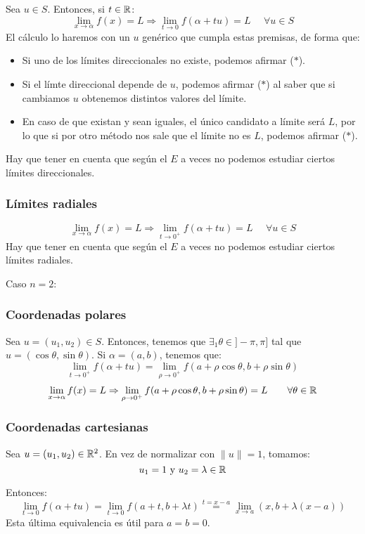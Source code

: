 Sea $u \in S$. Entonces, si $t \in \mathbb R$:
$$\lim_{x \to \alpha}f(x) = L \Rightarrow \lim_{t \to 0}f(\alpha + tu) = L~~~~~~\forall u \in S$$
El cálculo lo haremos con un $u$ genérico que cumpla estas premisas, de forma que:
\begin{itemize}
    \item Si uno de los límites direccionales no existe, podemos afirmar ($\ast$).
    \item Si el límte direccional depende de $u$, podemos afirmar ($\ast$) al saber que si cambiamos
          $u$ obtenemos distintos valores del límite.
    \item En caso de que existan y sean iguales, el único candidato a límite será $L$, por lo que si por
          otro método nos sale que el límite no es $L$, podemos afirmar ($\ast$).
\end{itemize}

Hay que tener en cuenta que según el $E$ a veces no podemos estudiar ciertos límites direccionales.

\subsubsection{Límites radiales}
$$\lim_{x \to \alpha}f(x) = L \Rightarrow \lim_{t \to 0^{+}}f(\alpha + tu) = L~~~~~~\forall u \in S$$
Hay que tener en cuenta que según el $E$ a veces no podemos estudiar ciertos límites radiales.


Caso $n=2$:
\subsubsection{Coordenadas polares}

Sea $u = (u_1,u_2)\in S$. Entonces, tenemos que $\exists_1 \theta\in ]-\pi,\pi]$ tal que $u =(\cos\theta,\sin\theta)$. Si $\alpha=(a,b)$, tenemos que:
$$\lim_{t \to 0^{+}}f(\alpha+tu) = \lim_{\rho \to 0^+}f(a+\rho \cos\theta, b+\rho \sin\theta)$$
$$\lim_{x \to \alpha}f(x)=L \Rightarrow \lim_{\rho \rightarrow 0^+}f(a+\rho \cos\theta, b+\rho \sin\theta)=L~~~
    ~~~ \forall \theta \in \mathbb R$$

\subsubsection{Coordenadas cartesianas}
Sea $u=(u_1, u_2) \in \mathbb R^2$. En vez de normalizar con $\|u\|=1$, tomamos:
$$u_1 = 1 \mbox{ y } u_2 = \lambda \in \mathbb R$$

Entonces:
$$\lim_{t \to 0}f(\alpha + tu) = \lim_{t \to 0}f(a+t,b+\lambda t)
\stackrel{t=x-a}{=} \lim_{x\to a}(x,b+\lambda(x-a))
$$
Esta última equivalencia es útil para $a=b=0$.

